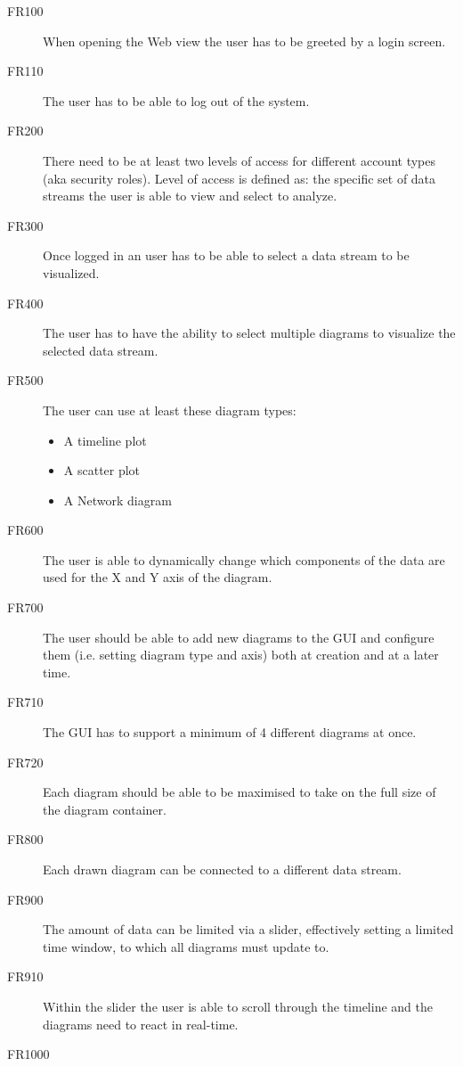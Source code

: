 \documentclass[twoside, english, final]{Pflichtenheft}
\begin{document}
\begin{description}
	\item[FR100]
	      When opening the Web view the user has to be greeted by a login screen.
	\item[FR110]
	      The user has to be able to log out of the system.

	\item[FR200]
	      There need to be at least two levels of access for different account types (aka security \glspl{role}).
	      Level of access is defined as: the specific set of \glspl{data stream} the user is able to view and select to analyze.
	\item[FR300]
	      Once logged in an user has to be able to select a data stream to be visualized.
	\item[FR400]
	      The user has to have the ability to select multiple \glspl{diagram} to visualize the selected \gls{data stream}.
	\item[FR500]
	      The user can use at least these \glspl{diagram type}:
	      \begin{itemize}
		      \item{A timeline plot}
		      \item{A scatter plot}
		      \item{A Network diagram}
	      \end{itemize}
	\item[FR600]
	      The user is able to dynamically change which components of the data are used for the X and Y axis of the diagram.
	\item[FR700]
	      The user should be able to add new diagrams to the GUI and configure them (i.e. setting diagram type and axis) both at creation and at a later time.
	\item[FR710]
	      The GUI has to support a minimum of 4 different diagrams at once.
	\item[FR720]
	      Each diagram should be able to be maximised to take on the full size of the \gls{diagram container}.
	\item[FR800]
	      Each drawn diagram can be connected to a different data stream.
	\item[FR900]
	      The amount of data can be limited via a slider, effectively setting a limited time window, to which all diagrams must update to.
	\item[FR910]
	      Within the slider the user is able to scroll through the timeline and the diagrams need to react in real-time.
	\item[FR1000]

\end{description}
\end{document}
